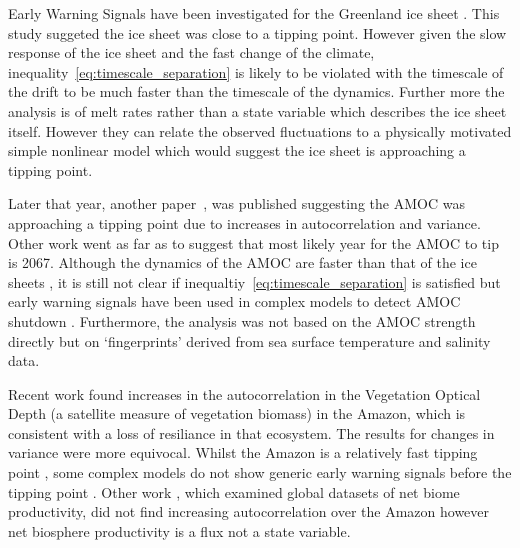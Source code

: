 Early Warning Signals have been investigated for the Greenland ice sheet \parencite{Boers2021}. This study suggeted the ice sheet was close to a tipping point. However given the slow response of the ice sheet and
the fast change of the climate, inequality~\ref{eq:timescale_separation} is likely to be violated with the timescale of the drift to be much faster than the timescale of the dynamics. Further more the analysis is of melt rates
rather than a state variable which describes the ice sheet itself. However they can relate the observed fluctuations to a physically motivated simple nonlinear model which would suggest the ice sheet is approaching a tipping point.

Later that year, another paper~\cite{Boers2021a}, was published suggesting the AMOC was approaching a tipping point due to increases in autocorrelation and variance. Other work \parencite{Ditlevsen2022arxiv} went as far
as to suggest that most likely year for the AMOC to tip is 2067. Although the dynamics of the AMOC are faster than that of the ice sheets \parencite{ArmstrongMcKay2022}, it is still not clear if
inequaltiy~\ref{eq:timescale_separation} is satisfied but early warning signals have been used in complex models to detect AMOC shutdown \parencite{Boulton2014}.
Furthermore, the analysis was not based on the AMOC strength directly but on `fingerprints' derived from sea surface temperature and salinity data.

Recent work \parencite{Boulton2022} found increases in the autocorrelation in  the Vegetation Optical Depth (a satellite measure of vegetation biomass) in the Amazon, which is consistent with a loss of resiliance in that
ecosystem. The results for changes in variance were more equivocal. Whilst the Amazon is a relatively fast tipping point \parencite{Ritchie2021}, some complex models do not show generic early warning signals before the
tipping point \parencite{Boulton2013}. Other work \parencite{Fernandez-Martinez2023}, which examined global datasets of net biome productivity, did not find increasing autocorrelation over the Amazon however net biosphere
productivity is a flux not a state variable.